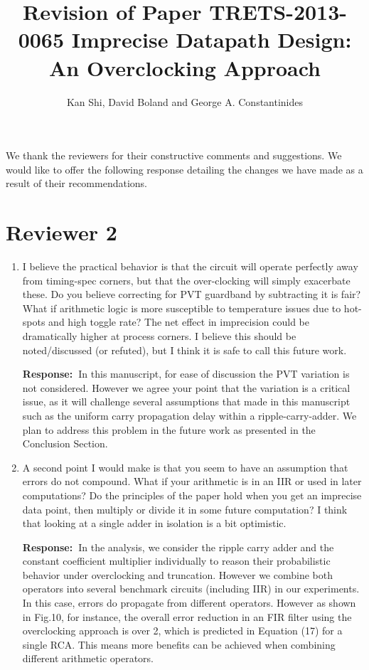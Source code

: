 \documentclass[a4paper, 11pt]{article}
\title{Revision of Paper TRETS-2013-0065 Imprecise Datapath Design: An Overclocking Approach}
\author{Kan Shi, David Boland and George A. Constantinides}
\date{}
\def\Response{\noindent \textbf{Response:~}}
\newcommand{\Question}[1]{\textcolor[rgb]{0.51,0.00,0.00}{#1}}
\begin{document}
\maketitle

We thank the reviewers for their constructive comments and suggestions. We would like to offer the following response detailing the changes we have made as a result of their recommendations.

\section*{Reviewer 2}
\begin{enumerate}
  \item \Question{I believe the practical behavior is that the circuit will operate perfectly away from timing-spec corners, but that the over-clocking will simply exacerbate these. Do you believe correcting for PVT guardband by subtracting it is fair? What if arithmetic logic is more susceptible to temperature issues due to hot-spots and high toggle rate? The net effect in imprecision could be dramatically higher at process corners. I believe this should be noted/discussed (or refuted), but I think it is safe to call this future work.}
      
      \Response In this manuscript, for ease of discussion the PVT variation is not considered. However we agree your point that the variation is a critical issue, as it will challenge several assumptions that made in this manuscript such as the uniform carry propagation delay within a ripple-carry-adder. We plan to address this problem in the future work as presented in the Conclusion Section.
      
  \item \Question{A second point I would make is that you seem to have an assumption that errors do not compound. What if your arithmetic is in an IIR or used in later computations? Do the principles of the paper hold when you get an imprecise data point, then multiply or divide it in some future computation?  I think that looking at a single adder in isolation is a bit optimistic.}
      
      \Response In the analysis, we consider the ripple carry adder and the constant coefficient multiplier individually to reason their probabilistic behavior under overclocking and truncation. However we combine both operators into several benchmark circuits (including IIR) in our experiments. In this case, errors do propagate from different operators. However as shown in Fig.10, for instance, the overall error reduction in an FIR filter using the overclocking approach is over 2, which is predicted in Equation (17) for a single RCA. This means more benefits can be achieved when combining different arithmetic operators.
      

\end{enumerate}
\end{document}
